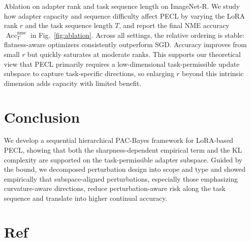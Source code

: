 \documentclass[10pt]{article} %
\begin{document}
\vspace{-4pt}

Ablation on adapter rank and task sequence length on ImageNet-R.
We study how adapter capacity and sequence difficulty affect PECL by varying the LoRA rank $r$ and the task sequence length $T$, and report the final NME accuracy $\operatorname{Acc}_T^{\mathrm{nme}}$ in Fig.~\ref{fig:ablation}.
Across all settings, the relative ordering is stable: flatness-aware optimizers consistently outperform SGD.
Accuracy improves from small $r$ but quickly saturates at moderate ranks. This supports our theoretical view that PECL primarily requires a low-dimensional task-permissible update subspace to capture task-specific directions, so enlarging $r$ beyond this intrinsic dimension adds capacity with limited benefit.




\section{Conclusion}

We develop a sequential hierarchical PAC-Bayes framework for LoRA-based PECL, showing that both the sharpness-dependent empirical term and the KL complexity are supported on the task-permissible adapter subspace. Guided by the bound, we decomposed perturbation design into scope and type and showed empirically that subspace-aligned perturbations, especially those emphasizing curvature-aware directions, reduce perturbation-aware risk along the task sequence and translate into higher continual accuracy.

\section{Ref}




\appendix



\end{document}
